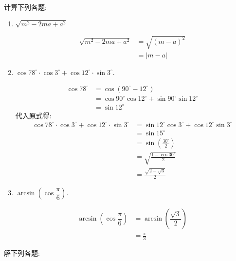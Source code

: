 \documentclass[answers]{exam}
\begin{document}
\begin{questions}
\begin{enumerate}[label=(\arabic*)]
	\end{enumerate}

	\question 计算下列各题:
	\begin{enumerate}[label=(\arabic*)]
		\item $\sqrt{m^2 - 2ma + a^2} $
		      \begin{solution}
			      \begin{align*}
				      \sqrt{m^2 - 2ma + a^2} & = \sqrt{(m-a)^2} \\
				                             & = |m-a|
			      \end{align*}
		      \end{solution}
		\item $\cos78^\circ\cdot\cos3^\circ + \cos12^\circ\cdot\sin3^\circ$.
		      \begin{solution}
			      \begin{align*}
				      \cos78^\circ & = \cos(90^\circ - 12^\circ)                           \\
				                   & = \cos90^\circ\cos12^\circ + \sin90^\circ\sin12^\circ \\
				                   & = \sin12^\circ
			      \end{align*}
			      代入原式得:
			      \begin{align*}
				      \cos78^\circ\cdot\cos3^\circ + \cos12^\circ\cdot\sin3^\circ
				       & = \sin12^\circ\cos3^\circ + \cos12^\circ\sin3^\circ \\
				       & = \sin15^\circ                                      \\
				       & = \sin\left(\frac{30^\circ}{2}\right)               \\
				       & = \sqrt{\frac{1-\cos30^\circ}{2}}                   \\
				       & = \frac{\sqrt{2-\sqrt{3}}}{2}
			      \end{align*}
		      \end{solution}
		\item $\arcsin\left(\cos\dfrac\pi6\right)$.
		      \begin{solution}
			      \begin{align*}
				      \arcsin\left(\cos\dfrac\pi6\right) & = \arcsin(\dfrac{\sqrt{3}}2) \\
				                                         & = \frac{\pi}{3}
			      \end{align*}
		      \end{solution}
	\end{enumerate}
	\question 解下列各题:

\end{questions}
\end{document}
